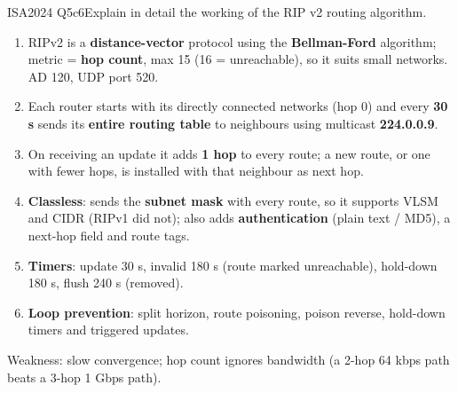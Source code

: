 \documentclass[10pt]{article}
\begin{document}
\begin{pastq}{ISA2024 Q5c}{6}Explain in detail the working of the RIP v2 routing algorithm.\end{pastq}
\begin{ans}
\begin{enumerate}
\item RIPv2 is a \textbf{distance-vector} protocol using the \textbf{Bellman-Ford} algorithm; metric = \textbf{hop count}, max 15 (16 = unreachable), so it suits small networks. AD 120, UDP port 520.
\item Each router starts with its directly connected networks (hop 0) and every \textbf{30 s} sends its \textbf{entire routing table} to neighbours using multicast \textbf{224.0.0.9}.
\item On receiving an update it adds \textbf{1 hop} to every route; a new route, or one with fewer hops, is installed with that neighbour as next hop.
\item \textbf{Classless}: sends the \textbf{subnet mask} with every route, so it supports VLSM and CIDR (RIPv1 did not); also adds \textbf{authentication} (plain text / MD5), a next-hop field and route tags.
\item \textbf{Timers}: update 30 s, invalid 180 s (route marked unreachable), hold-down 180 s, flush 240 s (removed).
\item \textbf{Loop prevention}: split horizon, route poisoning, poison reverse, hold-down timers and triggered updates.
\end{enumerate}
Weakness: slow convergence; hop count ignores bandwidth (a 2-hop 64 kbps path beats a 3-hop 1 Gbps path).
\end{ans}
\end{document}
